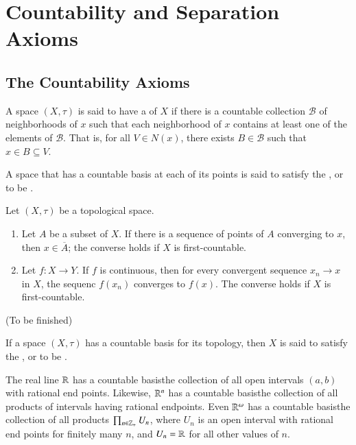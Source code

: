 \documentclass[12pt, a4paper, twoside, openright, titlepage]{book}
\begin{document}
\chapter{\textsection Countability and Separation Axioms}


\section{The Countability Axioms}

\begin{defn}{}{}
    A space $(X,\tau)$ is said to have a  of $X$ if there is a countable collection $\mathcal{B}$ of neighborhoods of $x$ such that each neighborhood of $x$ contains at least one of the elements of $\mathcal{B}$. That is, for all $V \in N(x)$, there exists $B \in \mathcal{B}$ such that $x \in B \subseteq V$.


    A space that has a countable basis at each of its points is said to satisfy the , or to be .
\end{defn}

\begin{thm}{}{}
    Let $(X,\tau)$ be a topological space. \begin{enumerate}
        \item Let $A$ be a subset of $X$. If there is a sequence of points of $A$ converging to $x$, then $x \in \overline{A}$; the converse holds if $X$ is first-countable.
        \item Let $f:X\rightarrow Y$. If $f$ is continuous, then for every convergent sequence $x_n\rightarrow x$ in $X$, the sequenc $f(x_n)$ converges to $f(x)$. The converse holds if $X$ is first-countable.
    \end{enumerate}
\end{thm}
\begin{proof*}{}{}
    (To be finished)
\end{proof*}


\begin{defn}{}{}
    If a space $(X,\tau)$ has a countable basis for its topology, then $X$ is said to satisfy the , or to be .
\end{defn}

\begin{eg}{}{}
    The real line $\mathbb R$ has a countable basis\textendash the collection of all open intervals $(a,b)$ with rational end points. Likewise, $\mathbb R^n$ has a countable basis\textendash the collection of all products of intervals having rational endpoints. Even $\mathbb R^{\omega}$ has a countable basis\textendash the collection of all products $\prod_{n\in\mathbb Z_+}U_n$, where $U_n$ is an open interval with rational end points for finitely many $n$, and $U_n = \mathbb R$ for all other values of $n$.
\end{eg}
\end{document}

